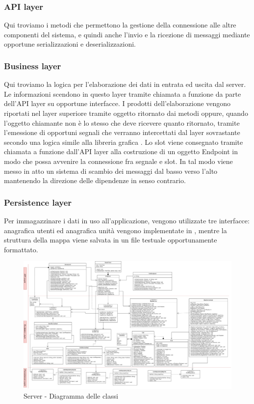 \subsubsection{API layer}
Qui troviamo i metodi che permettono la gestione della connessione alle altre componenti del sistema, e quindi anche l'invio e la ricezione di messaggi mediante opportune serializzazioni e deserializzazioni.

\subsubsection{Business layer}
Qui troviamo la logica per l'elaborazione dei dati in entrata ed uscita dal server.\\
Le informazioni scendono in questo layer tramite chiamata a funzione da parte dell'API layer su opportune interfacce. I prodotti dell'elaborazione vengono riportati nel layer superiore tramite oggetto ritornato dai metodi oppure, quando l'oggetto chiamante non è lo stesso che deve ricevere quanto ritornato, tramite l'emessione di opportuni segnali che verranno intercettati dal layer sovrastante secondo una logica  simile alla libreria grafica . Lo slot viene consegnato tramite chiamata a funzione dall'API layer alla costruzione di un oggetto Endpoint in modo che possa avvenire la connessione fra segnale e slot. In tal modo viene messo in atto un sistema di scambio dei messaggi dal basso verso l'alto mantenendo la direzione delle dipendenze in senso contrario.

\subsubsection{Persistence layer}
Per immagazzinare i dati in uso all'applicazione, vengono utilizzate tre interfacce: anagrafica utenti ed anagrafica unità vengono implementate in , mentre la struttura della mappa viene salvata in un file testuale opportunamente formattato.

\begin{landscape}
    \begin{figure}[h!]
        \includegraphics[width=26cm]{img/server_classi.png}
        \caption{Server - Diagramma delle classi}
    \end{figure}
\end{landscape}

